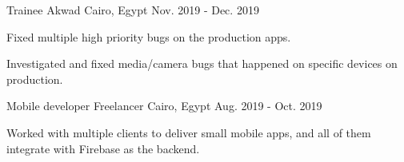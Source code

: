 \begin{cventries}
  \cventry
    {Trainee} %
    {Akwad} %
    {Cairo, Egypt} %
    {Nov. 2019 - Dec. 2019} %
    {
      \begin{cvitems}
        \item {Fixed multiple high priority bugs on the production apps.}
        \item {Investigated and fixed media/camera bugs that happened on specific devices on production.}
      \end{cvitems}
    }

  \cventry
    {Mobile developer} %
    {Freelancer} %
    {Cairo, Egypt} %
    {Aug. 2019 - Oct. 2019} %
    {
      \begin{cvitems}
        Worked with multiple clients to deliver small mobile apps, and all of them integrate with Firebase as the backend.
      \end{cvitems}
    }

\end{cventries}
  